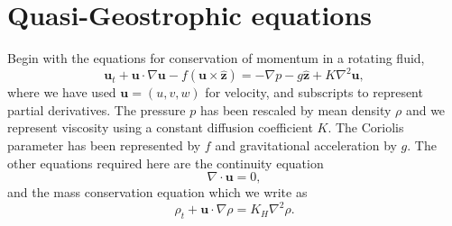 \documentclass[11pt, a4paper,twoside]{article}
\newcommand{\vc}[1]{\mathbf{#1}}
\numberwithin{equation}{section}
\begin{document}
\section{Quasi-Geostrophic equations}\label{sec:qg}
Begin with the equations for conservation of momentum in a rotating fluid,
\begin{equation}\label{eq:mom}
\vc{u}_t + \vc{u}\cdot\nabla\vc{u} - f(\vc{u}\times\vc{\hat{z}}) = -\nabla p -g\vc{\hat{z}} + K\nabla^2\vc{u},
\end{equation}
where we have used $\vc{u}=(u,v,w)$ for velocity, and subscripts to represent partial derivatives.
The pressure $p$ has been rescaled by mean density $\rho$ and we represent viscosity using a constant diffusion coefficient $K$.
The Coriolis parameter has been represented by $f$ and gravitational acceleration by $g$.
The other equations required here are the continuity equation
\begin{equation}\label{eq:cont}
\nabla\cdot\vc{u} = 0,
\end{equation}
and the mass conservation equation which we write as
\begin{equation}\label{eq:temp}
\rho_t + \vc{u}\cdot\nabla\rho = K_H\nabla^2\rho.
\end{equation}
\end{document}
